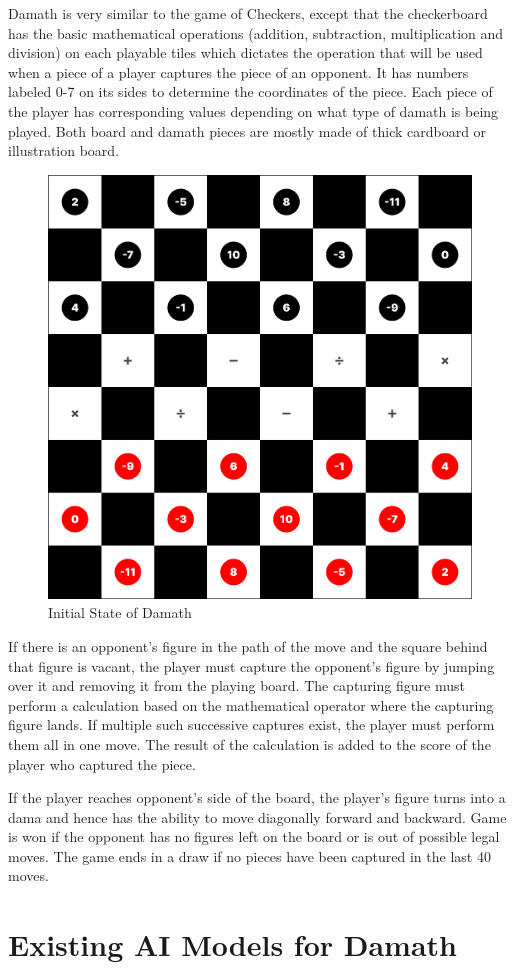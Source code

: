 Damath is very similar to the game of Checkers, except that the checkerboard has the basic mathematical operations (addition, subtraction, multiplication and division) on each playable tiles which dictates the operation that will be used when a piece of a player captures the piece of an opponent. It has numbers labeled 0-7 on its sides to determine the coordinates of the piece. Each piece of the player has corresponding values depending on what type of damath is being played. Both board and damath pieces are mostly made of thick cardboard or illustration board.

\begin{figure}[htb]
     \centering
     \includegraphics[width=0.5\linewidth]{images/initial_state.png}
     \caption{Initial State of Damath}
     \label{fig:initial_state}
\end{figure}
 
If there is an opponent's figure in the path of the move and the square behind that figure is vacant, the player must capture the opponent's figure by jumping over it and removing it from the playing board. The capturing figure must perform a calculation based on the mathematical operator where the capturing figure lands. If multiple such successive captures exist, the player must perform them all in one move. The result of the calculation is added to the score of the player who captured the piece.

If the player reaches opponent’s side of the board, the player's figure turns into a dama and hence has the ability to move diagonally forward and backward. Game is won if the opponent has no figures left on the board or is out of possible legal moves. The game ends in a draw if no pieces have been captured in the last 40 moves.
 

\section{Existing AI Models for Damath}

